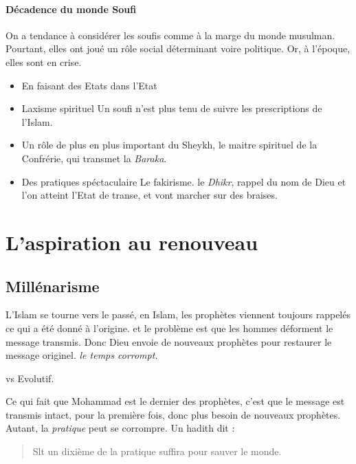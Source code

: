 \paragraph{Décadence du monde Soufi} On a tendance à considérer les soufis comme à la marge du monde musulman. Pourtant, elles ont joué un rôle social déterminant voire politique. Or, à l'époque, elles sont en crise.
\begin{itemize}
    \item {En faisant des Etats dans l'Etat} 
\item {Laxisme spirituel} Un soufi n'est plus tenu de suivre les prescriptions de l'Islam.
\item {Un rôle de plus en plus important du Sheykh}, le maitre spirituel de la Confrérie, qui transmet la \emph{Baraka}.
\item {Des pratiques spéctaculaire} Le fakirisme. le \emph{Dhikr}, rappel du nom de Dieu et l'on atteint l'Etat de transe, et vont marcher sur des braises. 

\end{itemize}



\section{L'aspiration au
  renouveau}
\subsection{Millénarisme}


 \begin{Def}
 L'Islam se tourne vers le passé, en Islam, les prophètes viennent toujours rappelés ce qui a été donné à l'origine. et le problème est que les hommes déforment le message transmis. Donc Dieu envoie de nouveaux prophètes pour restaurer le message originel. \textit{le temps corrompt.}
 
 \end{Def}
 vs Evolutif. 
 
 Ce qui fait que Mohammad est le dernier des prophètes, c'est que le message est transmis intact, pour la première fois, donc plus besoin de nouveaux prophètes. Autant, la \textit{pratique} peut se corrompre. 
 Un hadith dit : 
 \begin{quote}
     Slt un dixième de la pratique suffira pour sauver le monde.
 \end{quote}
 
